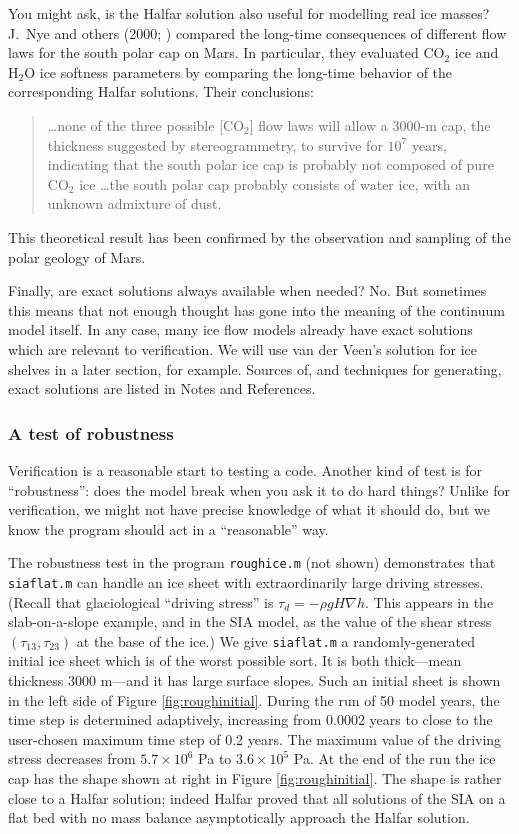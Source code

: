 \documentclass[titlepage,a4paper,final,12pt]{scrartcl}
\newcommand{\grad}{\nabla}
\begin{document}
You might ask, is the Halfar solution also useful for modelling real ice masses?  J.~Nye and others (2000; \cite{NyeIcarus2000}) compared the long-time consequences of different flow laws for the south polar cap on Mars.  In particular, they evaluated $\text{CO}_2$ ice and $\text{H}_2\text{O}$ ice softness parameters by comparing the long-time behavior of the corresponding Halfar solutions.  Their conclusions:
  \begin{quote}
  \dots none of the three possible [$\text{CO}_2$] flow laws will allow a 3000-m cap, the thickness suggested by stereogrammetry, to survive for $10^7$ years, indicating that the south polar ice cap is probably not composed of pure $\text{CO}_2$ ice \dots the south polar cap probably consists of water ice, with an unknown admixture of dust.
  \end{quote}
This theoretical result has been confirmed by the observation and sampling of the polar geology of Mars.

Finally, are exact solutions always available when needed?  No.  But sometimes this means that not enough thought has gone into the meaning of the continuum model itself.  In any case, many ice flow models already have exact solutions which are relevant to verification.  We will use van der Veen's solution for ice shelves in a later section, for example.  Sources of, and techniques for generating, exact solutions are listed in Notes and References.

\subsubsection*{A test of robustness}  Verification is a reasonable start to testing a code.  Another kind of test is for ``robustness'': does the model break when you ask it to do hard things?  Unlike for verification, we might not have precise knowledge of what it should do, but we know the program should act in a ``reasonable'' way.

The robustness test in the program \texttt{roughice.m} (not shown) demonstrates that \texttt{siaflat.m} can handle an ice sheet with extraordinarily large driving stresses.  (Recall that glaciological ``driving stress'' is $\tau_d = - \rho g H \grad h$.  This appears in the slab-on-a-slope example, and in the SIA model, as the value of the shear stress $(\tau_{13},\tau_{23})$ at the base of the ice.)  We give \texttt{siaflat.m} a randomly-generated initial ice sheet which is of the worst possible sort.  It is both thick---mean thickness 3000 m---and it has large surface slopes.  Such an initial sheet is shown in the left side of Figure \ref{fig:roughinitial}.  During the run of 50 model years, the time step is determined adaptively, increasing from 0.0002 years to close to the user-chosen maximum time step of 0.2 years.  The maximum value of the driving stress decreases from $5.7\times 10^6$ Pa to $3.6\times 10^5$ Pa.  At the end of the run the ice cap has the shape shown at right in Figure \ref{fig:roughinitial}.  The shape is rather close to a Halfar solution; indeed Halfar proved that all solutions of the SIA on a flat bed with no mass balance asymptotically approach the Halfar solution.
\end{document}
